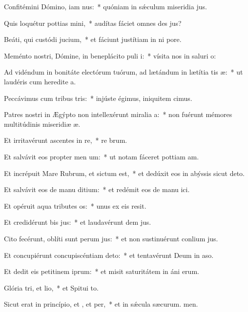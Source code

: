 \item Confitémini Dómino, iam nus:~* quóniam in sǽculum miseridia jus.
\item Quis loquétur pottias mini,~* audítas fáciet omnes des jus?
\item Beáti, qui custódi jucium,~* et fáciunt justítiam in ni pore.
\item Meménto nostri, Dómine, in beneplácito puli i:~* vísita nos in saluri o:
\item Ad vidéndum in bonitáte electórum tuórum, ad lætándum in lætítia tis æ:~* ut laudéris cum heredite a.
\item Peccávimus cum tribus tris:~* injúste égimus, iniquitem cimus.
\item Patres nostri in Ægýpto non intellexérunt miralia a:~* non fuérunt mémores multitúdinis miseridiæ æ.
\item Et irritavérunt ascentes in re,~* re brum.
\item Et salvávit eos propter men um:~* ut notam fáceret pottiam am.
\item Et incrépuit Mare Rubrum, et sictum est,~* et dedúxit eos in abýssis sicut  deto.
\item Et salvávit eos de manu ditium:~* et redémit eos de manu ici.
\item Et opéruit aqua tributes os:~* unus ex eis  resit.
\item Et credidérunt bis jus:~* et laudavérunt dem jus.
\item Cito fecérunt, oblíti sunt perum jus:~* et non sustinuérunt conlium jus.
\item Et concupiérunt concupiscéntiam  deto:~* et tentavérunt Deum in aso.
\item Et dedit eis petitinem iprum:~* et misit saturitátem in áni erum.
\item Glória tri, et lio,~* et Spitui to.
\item Sicut erat in princípio, et , et per,~* et in sǽcula sæcurum. men.
